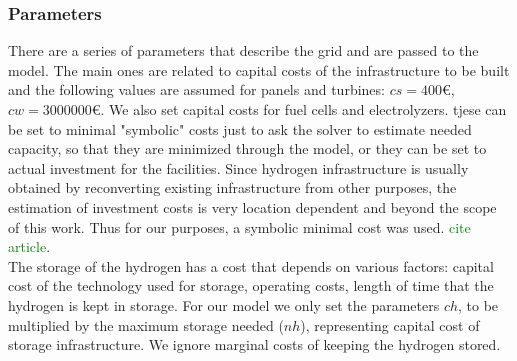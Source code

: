 
\subsubsection{Parameters}

\indent There are a series of parameters that describe the grid and are passed to the model. The main ones are related to capital costs of the infrastructure to be built and the following values are assumed for panels and turbines: $cs = 400$\euro, $cw = 3 000 000$\euro. 
We also set capital costs for fuel cells and electrolyzers. tjese can be set to minimal "symbolic" costs just to ask the solver to estimate needed capacity, so that they are minimized through the model, or they can be set to actual investment for the facilities. Since hydrogen infrastructure is usually obtained by reconverting existing infrastructure from other purposes, the estimation of investment costs is very location dependent and beyond the scope of this work. Thus for our purposes, a symbolic minimal cost was used. \textcolor{Green}{cite article}.\\
\indent The storage of the hydrogen has a cost that depends on various factors: capital cost of the technology used for storage, operating costs, length of time that the hydrogen is kept in storage. For our model we only set the parameters $ch$, to be multiplied by the maximum storage needed ($nh$), representing capital cost of storage infrastructure. We ignore marginal costs of keeping the hydrogen stored. \\

